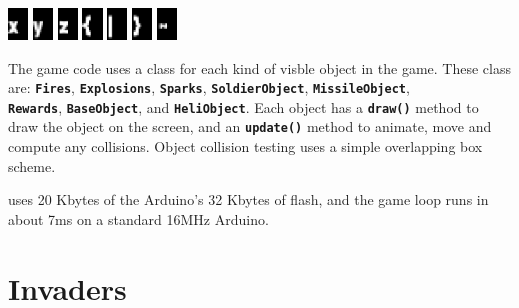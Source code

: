 \documentclass[10pt]{book}
\newcommand{\mach}[1]{\texttt{\textbf{#1}}}
\begin{document}
\begin{center}
\includegraphics[width=0.04\textwidth]{previews/nightstrike_2-INFOFONT-88.png}
\includegraphics[width=0.04\textwidth]{previews/nightstrike_2-INFOFONT-89.png}
\includegraphics[width=0.04\textwidth]{previews/nightstrike_2-INFOFONT-90.png}
\includegraphics[width=0.04\textwidth]{previews/nightstrike_2-INFOFONT-91.png}
\includegraphics[width=0.04\textwidth]{previews/nightstrike_2-INFOFONT-92.png}
\includegraphics[width=0.04\textwidth]{previews/nightstrike_2-INFOFONT-93.png}
\includegraphics[width=0.04\textwidth]{previews/nightstrike_2-INFOFONT-94.png}
\end{center}

The game code uses a class for each kind of visble object in the game.
These class are:
\mach{Fires},
\mach{Explosions},
\mach{Sparks},
\mach{SoldierObject},
\mach{MissileObject}, \\
\mach{Rewards},
\mach{BaseObject}, and
\mach{HeliObject}.
Each object has a \mach{draw()} method to draw the object on the screen,
and an \mach{update()} method to animate, move and compute any collisions.
Object collision testing uses a simple overlapping box scheme.

 uses 20 Kbytes of the Arduino's 32 Kbytes of flash, and
the game loop runs in about 7ms on a standard 16MHz Arduino.

\newpage
\section{Invaders}
\end{document}
